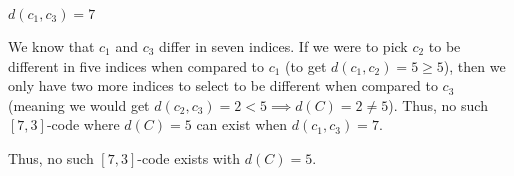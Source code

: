  $ d(c_1,c_3)=7 $

We know that $ c_1 $ and $ c_3 $ differ in seven indices.
If we were to pick $ c_2 $ to be different in five indices when
compared to $ c_1 $ (to get $ d(c_1,c_2)=5\ge 5 $), then we only have two more
indices to select to be different when compared to $ c_3 $ (meaning we would get
$ d(c_2,c_3)=2<5 \implies d(C)=2\neq 5$). Thus, no such $ [7,3] $-code where
$ d(C)=5 $ can exist when $ d(c_1,c_3)=7 $.

Thus, no such $ [7,3] $-code exists with $ d(C)=5 $.

